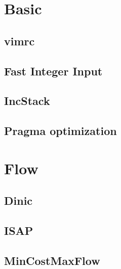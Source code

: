 \documentclass[a4paper,10pt,twocolumn,oneside]{article}
\begin{document}
\pagestyle{fancy}
\fancyfoot{}
\fancyhead[R]{\thepage}
\renewcommand{\headrulewidth}{0.4pt}
\renewcommand{\contentsname}{Contents} 

\scriptsize
\tableofcontents
\newpage
%
\section{Basic}
\subsection{vimrc}

\subsection{Fast Integer Input}

\subsection{IncStack}

\subsection{Pragma optimization}

\section{Flow}
\subsection{Dinic}

\subsection{ISAP}

\subsection{MinCostMaxFlow}

\end{document}

